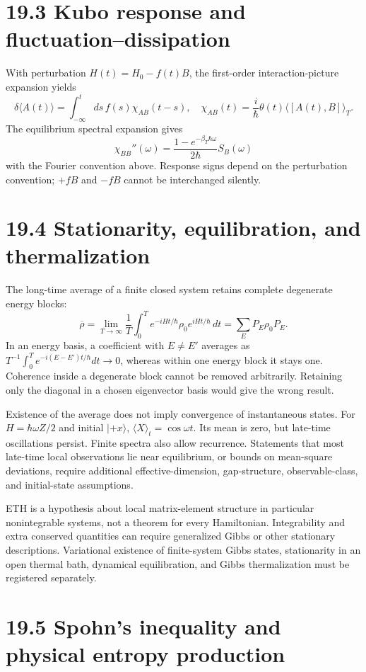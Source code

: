 \documentclass[
  11pt,
  oneside]{book}
\begin{document}
\section{19.3 Kubo response and fluctuation--dissipation}

With perturbation \(H(t)=H_0-f(t)B\), the first-order
interaction-picture expansion yields \[
\delta\langle A(t)\rangle=
\int_{-\infty}^tds\,f(s)\chi_{AB}(t-s),\quad
\chi_{AB}(t)=\frac{i}{\hbar}\theta(t)\langle[A(t),B]\rangle_T.
\] The equilibrium spectral expansion gives \[
\chi_{BB}''(\omega)
=\frac{1-e^{-\beta_T\hbar\omega}}{2\hbar}S_B(\omega)
\] with the Fourier convention above. Response signs depend on the
perturbation convention; \(+fB\) and \(-fB\) cannot be interchanged
silently.

\section{19.4 Stationarity, equilibration, and thermalization}

The long-time average of a finite closed system retains complete
degenerate energy blocks: \[
\overline\rho=\lim_{T\to\infty}\frac1T\int_0^T
 e^{-iHt/\hbar}\rho_0e^{iHt/\hbar}\,dt
=\sum_E P_E\rho_0P_E.
\] In an energy basis, a coefficient with \(E\ne E'\) averages as
\(T^{-1}\int_0^T e^{-i(E-E')t/\hbar}dt\to0\), whereas within one energy
block it stays one. Coherence inside a degenerate block cannot be
removed arbitrarily. Retaining only the diagonal in a chosen eigenvector
basis would give the wrong result.

Existence of the average does not imply convergence of instantaneous
states. For \(H=\hbar\omega Z/2\) and initial \(|+x\rangle\),
\(\langle X\rangle_t=\cos\omega t\). Its mean is zero, but late-time
oscillations persist. Finite spectra also allow recurrence. Statements
that most late-time local observations lie near equilibrium, or bounds
on mean-square deviations, require additional effective-dimension,
gap-structure, observable-class, and initial-state assumptions.

ETH is a hypothesis about local matrix-element structure in particular
nonintegrable systems, not a theorem for every Hamiltonian.
Integrability and extra conserved quantities can require generalized
Gibbs or other stationary descriptions. Variational existence of
finite-system Gibbs states, stationarity in an open thermal bath,
dynamical equilibration, and Gibbs thermalization must be registered
separately.

\section{19.5 Spohn's inequality and physical entropy production}
\end{document}
